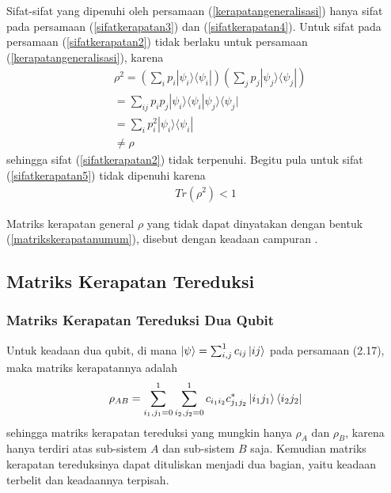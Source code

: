\par
Sifat-sifat yang dipenuhi oleh persamaan (\ref{kerapatangeneralisasi}) hanya sifat pada persamaan (\ref{sifatkerapatan3}) dan (\ref{sifatkerapatan4}). Untuk sifat pada persamaan (\ref{sifatkerapatan2}) tidak berlaku untuk persamaan (\ref{kerapatangeneralisasi}), karena
\begin{equation}
	\begin{aligned}
		&\rho^2=(\sum_i p_i |\psi_i\rangle\langle\psi_i|)(\sum_j p_j |\psi_j\rangle\langle\psi_j|)\\
		&=\sum_{ij} p_i p_j |\psi_i\rangle \langle\psi_i|\psi_j\rangle \langle\psi_j|\\
		&=\sum_i p_i^2 |\psi_i\rangle\langle\psi_i|\\
		&\neq \rho
	\end{aligned}
\end{equation}
sehingga sifat (\ref{sifatkerapatan2}) tidak terpenuhi. Begitu pula untuk sifat (\ref{sifatkerapatan5}) tidak dipenuhi karena
\begin{equation}
	\begin{aligned}
		Tr(\rho^2)<1
	\end{aligned}
\end{equation}
\par
Matriks kerapatan general $\rho$ yang tidak dapat dinyatakan dengan bentuk (\ref{matrikskerapatanumum}), disebut dengan keadaan campuran \cite{nakahara2008quantum}.

\subsection{Matriks Kerapatan Tereduksi}
\subsubsection{Matriks Kerapatan Tereduksi Dua Qubit}
Untuk keadaan dua qubit, di mana $\ket{\psi}=\sum_{i,j}^{1}c_{ij}\ket{ij}$ pada persamaan (2.17), maka matriks kerapatannya adalah
\begin{equation}
	\rho_{AB}=\sum_{i_1,j_1=0}^1\sum_{i_2,j_2=0}^1c_{i_1 i_2}c^{*}_{j_1 j_2}\ket{i_1j_1}\bra{i_2j_2}\label{asal2qubit}
\end{equation}
sehingga matriks kerapatan tereduksi yang mungkin hanya $\rho_A$ dan $\rho_B$, karena hanya terdiri atas sub-sistem $A$ dan sub-sistem $B$ saja. Kemudian matriks kerapatan tereduksinya dapat dituliskan menjadi dua bagian, yaitu keadaan terbelit dan keadaannya terpisah.


